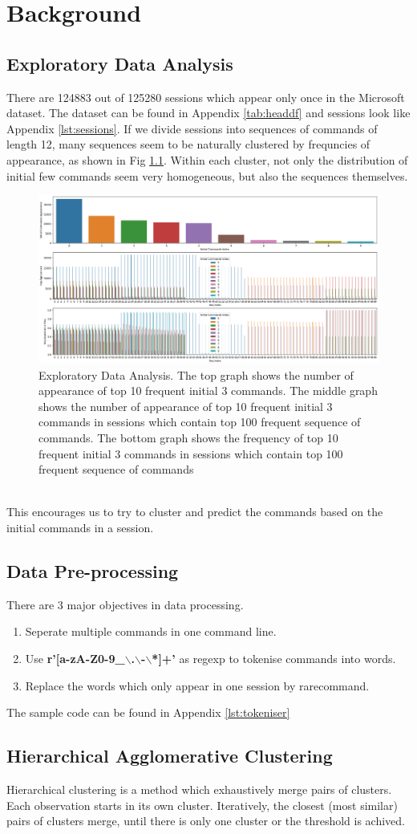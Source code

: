\chapter{Background}

\section{Exploratory Data Analysis}
There are 124883 out of 125280 sessions which appear only once in the Microsoft dataset.
The dataset can be found in Appendix \ref{tab:headdf} and sessions look like Appendix \ref{lst:sessions}.
If we divide sessions into sequences of commands of length 12\cite{sadique2021analysis},
many sequences seem to be naturally clustered by frequncies of appearance, as shown in Fig \ref{fig:EDA}.
Within each cluster, not only the distribution of initial few commands seem very homogeneous,
but also the sequences themselves.
\begin{figure}[h]
    \centering
    \includegraphics[scale=0.3]{background/EDA.png}
    \caption{Exploratory Data Analysis. The top graph shows the number of appearance of 
    top 10 frequent initial 3 commands. The middle graph shows the number of appearance of 
    top 10 frequent initial 3 commands in sessions which contain top 100 frequent sequence of commands.
    The bottom graph shows the frequency of top 10 frequent 
    initial 3 commands in sessions which contain top 100 frequent sequence of commands}
    \label{fig:EDA}
\end{figure}
\\
This encourages us to try to cluster and predict the commands based on the initial commands in a session.
\section{Data Pre-processing}
There are 3 major objectives in data processing.
\begin{enumerate}
    \item Seperate multiple commands in one command line.
    \item Use \textbf{r'[a-zA-Z0-9\_$\backslash$.$\backslash$-$\backslash$*]+'} as regexp to tokenise commands into words.
    \item Replace the words which only appear in one session by rarecommand.
\end{enumerate}
The sample code can be found in Appendix \ref{lst:tokeniser}
\section{Hierarchical Agglomerative Clustering}
Hierarchical clustering is a method which exhaustively merge pairs of clusters.
Each observation starts in its own cluster. 
Iteratively, the closest (most similar) pairs of clusters merge, 
until there is only one cluster or the threshold is achived.